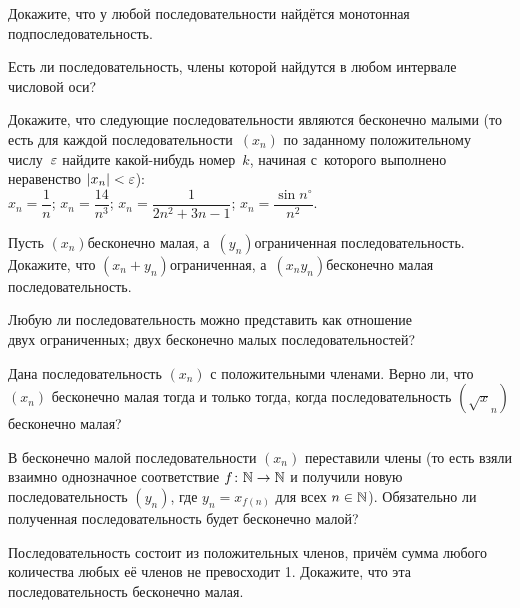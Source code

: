 \documentclass[a4paper,12pt]{article}
\begin{document}
Докажите, что у любой последовательности найдётся монотонная подпоследовательность.

Есть ли последовательность, члены которой найдутся в любом интервале числовой оси?

Докажите, что следующие последовательности являются бесконечно малыми (то есть для каждой последовательности~$(x_n)$ по заданному положительному числу~$\varepsilon$ найдите какой-нибудь номер~$k$, начиная с~которого выполнено неравенство $|x_n|<\varepsilon$):\\
 $x_n=\dfrac1n$;
 $x_n=\dfrac{14}{n^3}$;
 $x_n=\dfrac1{2n^2+3n-1}$;
 $x_n=\dfrac{\sin n^\circ}{n^2}$.

Пусть $(x_n)$\т бесконечно малая, а~$(y_n)$\т ограниченная последовательность. Докажите, что $(x_n+y_n)$\т ограниченная, а~$(x_ny_n)$\т бесконечно малая последовательность.

Любую ли последовательность можно представить как отношение\\
 двух ограниченных;
 двух бесконечно малых последовательностей?

Дана последовательность $(x_n)$ с положительными членами. Верно ли, что $(x_n)$ бесконечно малая тогда и только тогда, когда последовательность $(\sqrt x_n)$ бесконечно малая?

В бесконечно малой последовательности $(x_n)$ переставили члены (то есть взяли взаимно однозначное соответствие $f\colon\mathbb{N}\rightarrow\mathbb{N}$ и получили новую последовательность $(y_n)$, где $y_n=x_{f(n)}$ для всех $n\in\mathbb{N}$). Обязательно ли полученная последовательность будет бесконечно малой?

Последовательность состоит из положительных членов, причём сумма любого количества любых её членов не превосходит 1. Докажите, что эта последовательность бесконечно малая.

\vfill
{}

\end{document}
